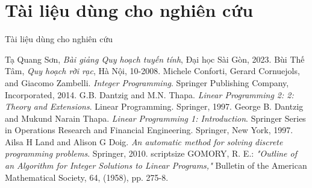 \documentclass{beamer}
\begin{document}
\section{Tài liệu dùng cho nghiên cứu}
\begin{frame}[allowframebreaks]{Tài liệu dùng cho nghiên cứu}
    \scriptsize
    \begin{thebibliography}{}
         Tạ Quang Sơn, \textit{Bài giảng Quy hoạch tuyến tính}, Đại học Sài Gòn, 2023.
         Bùi Thế Tâm, \textit{Quy hoạch rời rạc}, Hà Nội, 10-2008.
         Michele Conforti, Gerard Cornuejols, and Giacomo Zambelli. \textit{Integer Programming}. Springer Publishing Company, Incorporated, 2014.
         G.B. Dantzig and M.N. Thapa. \textit{Linear Programming 2: 2: Theory and Extensions}. Linear Programming. Springer, 1997.
         George B. Dantzig and Mukund Narain Thapa. \textit{Linear Programming 1: Introduction}. Springer Series in Operations Research and Financial Engineering. Springer, New York, 1997.
         Ailsa H Land and Alison G Doig. \textit{An automatic method for solving discrete programming problems}. Springer, 2010.
        scriptsize
         GOMORY, R. E.: \textit{"Outline of an Algorithm for Integer Solutions to Linear Programs,"} Bulletin of the American Mathematical Society, 64, (1958), pp. 275-8.
    \end{thebibliography}
\end{frame}

\begin{frame}
    \begin{block}{}
    \medskip
    \center{\huge \it \textcolor[rgb]{0.50,0.30,1.0}{Cảm ơn quý thầy cô và các anh chị đã quan tâm theo dõi!}}
    \medskip
    \end{block}	
\end{frame}    
\end{document}
